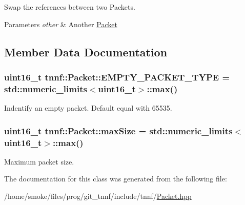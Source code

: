 Swap the references between two Packets. 


\begin{DoxyParams}{Parameters}
{\em other} & Another \hyperlink{classtnnf_1_1_packet}{Packet} \\
\hline
\end{DoxyParams}


\subsection{Member Data Documentation}
\hypertarget{classtnnf_1_1_packet_a91074632d9be293edd6994bab13d3e18}{}
\subsubsection[{E\+M\+P\+T\+Y\+\_\+\+P\+A\+C\+K\+E\+T\+\_\+\+T\+Y\+P\+E}]{\setlength{\rightskip}{0pt plus 5cm}uint16\+\_\+t tnnf\+::\+Packet\+::\+E\+M\+P\+T\+Y\+\_\+\+P\+A\+C\+K\+E\+T\+\_\+\+T\+Y\+P\+E = std\+::numeric\+\_\+limits$<$uint16\+\_\+t$>$\+::max()\hspace{0.3cm}{\ttfamily [static]}}\label{classtnnf_1_1_packet_a91074632d9be293edd6994bab13d3e18}


Indentify an empty packet. Default equal with 65535. 

\hypertarget{classtnnf_1_1_packet_a10b2f3efc472cddea13827383b65c8d5}{}
\subsubsection[{max\+Size}]{\setlength{\rightskip}{0pt plus 5cm}uint16\+\_\+t tnnf\+::\+Packet\+::max\+Size = std\+::numeric\+\_\+limits$<$uint16\+\_\+t$>$\+::max()\hspace{0.3cm}{\ttfamily [static]}}\label{classtnnf_1_1_packet_a10b2f3efc472cddea13827383b65c8d5}


Maximum packet size. 



The documentation for this class was generated from the following file\+:\begin{DoxyCompactItemize}
\item 
/home/smoke/files/prog/git\+\_\+tnnf/include/tnnf/\hyperlink{_packet_8hpp}{Packet.\+hpp}\end{DoxyCompactItemize}
